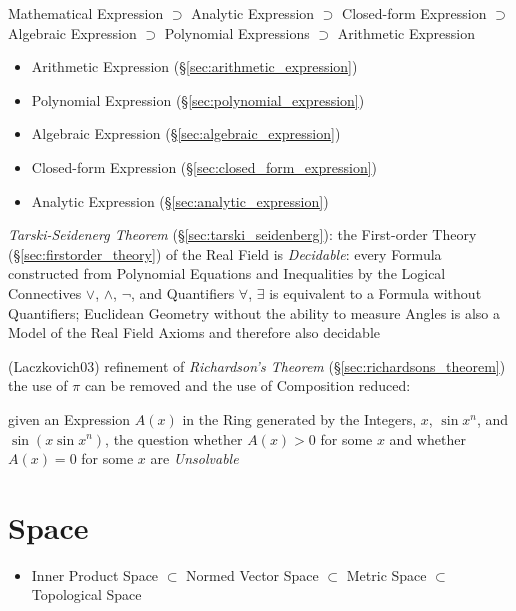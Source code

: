 Mathematical Expression $\supset$
Analytic Expression     $\supset$
Closed-form Expression  $\supset$
Algebraic Expression    $\supset$
Polynomial Expressions  $\supset$
Arithmetic Expression

\begin{itemize}
  \item Arithmetic Expression (\S\ref{sec:arithmetic_expression})
  \item Polynomial Expression (\S\ref{sec:polynomial_expression})
  \item Algebraic Expression (\S\ref{sec:algebraic_expression})
  \item Closed-form Expression (\S\ref{sec:closed_form_expression})
  \item Analytic Expression (\S\ref{sec:analytic_expression})
\end{itemize}

\emph{Tarski-Seidenerg Theorem} (\S\ref{sec:tarski_seidenberg}): the First-order
Theory (\S\ref{sec:firstorder_theory}) of the Real Field is \emph{Decidable}:
every Formula constructed from Polynomial Equations and Inequalities by the
Logical Connectives $\vee$, $\wedge$, $\neg$, and Quantifiers $\forall$,
$\exists$ is equivalent to a Formula without Quantifiers; Euclidean Geometry
without the ability to measure Angles is also a Model of the Real Field Axioms
and therefore also decidable

(Laczkovich03) refinement of \emph{Richardson's Theorem}
(\S\ref{sec:richardsons_theorem}) the use of $\pi$ can be removed and the use
of Composition reduced:

given an Expression $A(x)$ in the Ring generated by the Integers, $x$, $\sin
x^n$, and $\sin(x \sin x^n)$, the question whether $A(x) > 0$ for some $x$ and
whether $A(x) = 0$ for some $x$ are \emph{Unsolvable}



\section{Space}\label{sec:space}

\begin{itemize}
  \item Inner Product Space \newline
    $\subset$ Normed Vector Space \newline
    $\subset$ Metric Space \newline
    $\subset$ Topological Space
\end{itemize}

